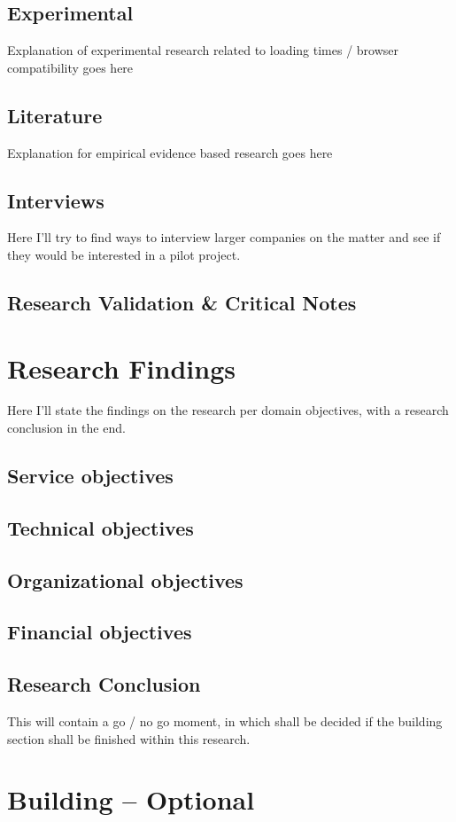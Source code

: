 \documentclass[15pt]{article}
\begin{document}
    \subsection{Experimental}
    Explanation of experimental research related to loading times / browser compatibility goes here
    \subsection{Literature}
    Explanation for empirical evidence based research goes here
    \subsection{Interviews}
    Here I'll try to find ways to interview larger companies on the matter and see if they would be interested in a pilot project.
    \subsection{Research Validation \& Critical Notes}
    
    
\section{Research Findings}
Here I'll state the findings on the research per domain objectives, with a research conclusion in the end.
	\subsection{Service objectives}
    \subsection{Technical objectives}
    \subsection{Organizational objectives}
    \subsection{Financial objectives}
	\subsection{Research Conclusion}
	This will contain a go / no go moment, in which shall be decided if the building section shall be finished within this research.
	
\section{Building -- Optional}
\end{document}
